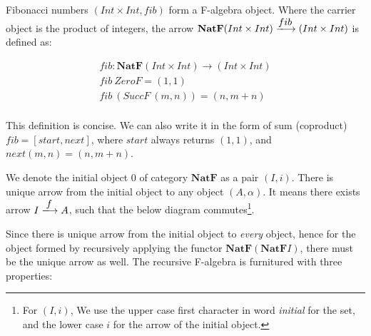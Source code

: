 \documentclass{article}
\begin{document}

Fibonacci numbers $(Int \times Int, fib)$ form a F-algebra object. Where the carrier object is the product of integers, the arrow $\mathbf{NatF} (Int \times Int) \arrowto{fib} (Int \times Int)$ is defined as:

\[
\begin{array}{l}
fib : \mathbf{NatF} (Int \times Int) \to (Int \times Int) \\
fib\ ZeroF = (1, 1) \\
fib\ (SuccF\ (m, n)) = (n, m + n) \\
\end{array}
\]

This definition is concise. We can also write it in the form of sum (coproduct) $fib = [start, next]$, where $start$ always returns $(1, 1)$, and $next(m, n) = (n, m + n)$.

We denote the initial object 0 of category $\pmb{NatF}$ as a pair $(I, i)$. There is unique arrow from the initial object to any object $(A, \alpha)$. It means there exists arrow $I \arrowto{f} A$, such that the below diagram commutes\footnote{For $(I, i)$, We use the upper case first character in word {\em initial} for the set, and the lower case $i$ for the arrow of the initial object.}.

\begin{center}
\end{center}

Since there is unique arrow from the initial object to {\em every} object, hence for the object formed by recursively applying the functor $\mathbf{NatF}(\mathbf{NatF}I)$, there must be the unique arrow as well. The recursive F-algebra is furnitured with three properties:
\end{document}
